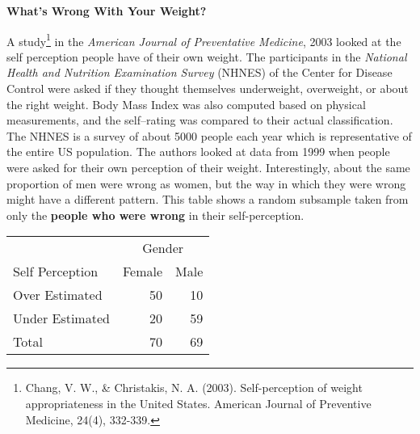 \def\theTopic{Weight Awareness}
\def\dayNum{13 }

\begin{center}
{\bf {\large What's Wrong With Your Weight?}}
\end{center}
\vspace{-.1in}


A study\footnote{Chang, V. W., \& Christakis,
  N. A. (2003). Self-perception of weight appropriateness in the
  United States. American Journal of Preventive Medicine, 24(4),
  332-339.}  in the {\em American Journal of Preventative Medicine},
  2003 looked at the self perception people have of their own weight.
  The participants in the {\em National Health and Nutrition
    Examination Survey} (NHNES) of the Center for Disease Control were
  asked  if they thought themselves underweight, overweight, or about
  the right weight.  Body Mass Index was also computed based on
  physical measurements, and the self--rating was compared to their
  actual classification.  The NHNES is a survey of about 5000 people each year
  which is representative of the entire US population.  The authors
  looked at data from 1999 when people were asked for their own
  perception of their weight. Interestingly, about the same
  proportion of men were wrong as women, but the way in which they
  were wrong might have a different pattern.  This table shows a
  random subsample taken from only the
  {\bf people who were wrong} in their self-perception.

  \begin{tabular}{|l|r|r|} \hline
       & \multicolumn{2}{|c|}{Gender} \\
Self Perception &Female  & Male \\ \hline
Over Estimated  &  50&  10  \\ \hline
Under Estimated &  20  & 59  \\ \hline
Total  &  70 & 69\\ \hline
  \end{tabular}
  
